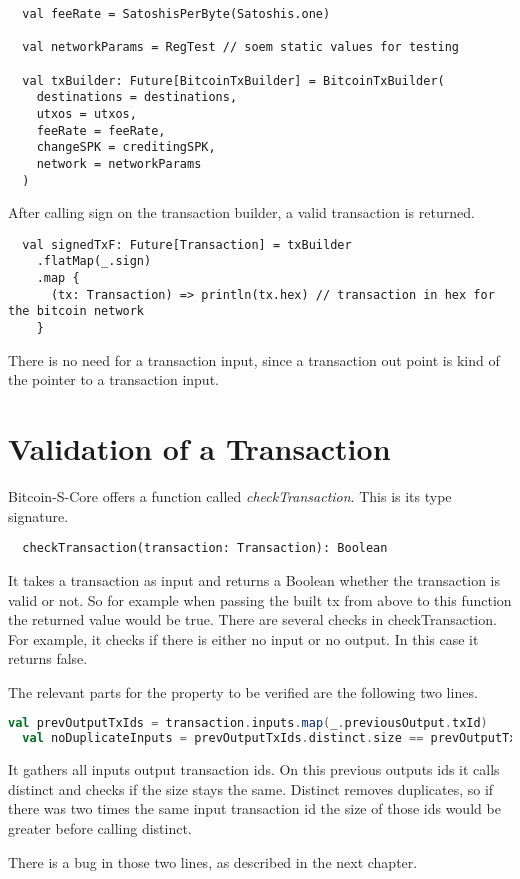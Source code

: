 \begin{lstlisting}
  val feeRate = SatoshisPerByte(Satoshis.one)

  val networkParams = RegTest // soem static values for testing

  val txBuilder: Future[BitcoinTxBuilder] = BitcoinTxBuilder(
    destinations = destinations,
    utxos = utxos,
    feeRate = feeRate,
    changeSPK = creditingSPK,
    network = networkParams
  )
\end{lstlisting}
After calling sign on the transaction builder, a valid transaction is returned.
\begin{lstlisting}
  val signedTxF: Future[Transaction] = txBuilder
    .flatMap(_.sign)
    .map {
      (tx: Transaction) => println(tx.hex) // transaction in hex for the bitcoin network
    }
\end{lstlisting}
There is no need for a transaction input, since a transaction out point is kind of the pointer to a transaction input.

\section{Validation of a Transaction}
Bitcoin-S-Core offers a function called \emph{checkTransaction}.
This is its type signature.
\begin{lstlisting}
  checkTransaction(transaction: Transaction): Boolean
\end{lstlisting}
It takes a transaction as input and returns a Boolean whether the transaction is valid or not.
So for example when passing the built tx from above to this function the returned value would be true.
There are several checks in checkTransaction.
For example, it checks if there is either no input or no output.
In this case it returns false.

The relevant parts for the property to be verified are the following two lines.
\begin{lstlisting}[language=scala]
  val prevOutputTxIds = transaction.inputs.map(_.previousOutput.txId)
  val noDuplicateInputs = prevOutputTxIds.distinct.size == prevOutputTxIds.size
\end{lstlisting}
It gathers all inputs output transaction ids.
On this previous outputs ids it calls distinct and checks if the size stays the same.
Distinct removes duplicates, so if there was two times the same input transaction id the size of those ids would be greater before calling distinct.

There is a bug in those two lines, as described in the next chapter.



